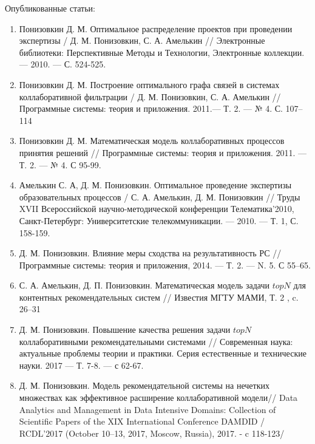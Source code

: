 \documentclass[a4paper,14pt]{report}
\theoremstyle{plain}
\theoremstyle{break}
\begin{document}
Опубликованные статьи:
\begin{enumerate}
\item Понизовкин Д. М.
Оптимальное распределение проектов при проведении экспертизы / Д. М. Понизовкин, С. А. Амелькин //
Электронные библиотеки: Перспективные Методы и Технологии,
Электронные коллекции. --- 2010. --- С. 524-525.
\item Понизовкин Д. М. Построение оптимального графа связей в системах коллаборативной фильтрации / Д. М. Понизовкин, С. А. Амелькин //
Программные системы: теория и приложения. 2011.--- Т. 2. --- № 4. С. 107–114
\item Понизовкин Д. М. Математическая модель коллаборативных процессов принятия решений //
Программные системы: теория и приложения. 2011. --- Т. 2. --- № 4. С 95-99.
\item Амелькин С. А, Д. М. Понизовкин. Оптимальное проведение экспертизы образовательных процессов / С. А. Амелькин, Д. М. Понизовкин //
Труды XVII Всероссийской научно-методической конференции Телематика’2010,
Санкт-Петербург: Университетские телекоммуникации. --- 2010. ---
Т. 1, С. 158-159.
\item Д. М. Понизовкин. Влияние меры сходства на результативность РС // Программные системы: теория и приложения, 2014. --- Т. 2. --- N. 5. С 55–65.
\item С. А. Амелькин, Д. П. Понизовкин. Математическая модель задачи $topN$ для
	контентных рекомендательных систем //
Известия МГТУ МАМИ, Т. 2 , c. 26–31

\item Д. М. Понизовкин.
	Повышение качества решения задачи $topN$ коллаборативными рекомендательными
	системами
	//
	Современная наука: актуальные проблемы теории и практики.
	Серия естественные и технические науки. 2017 ---
	Т. 7-8. --- с 62-67.
\item Д. М. Понизовкин.
		Модель рекомендательной системы на нечетких множествах
		как эффективное расширение коллаборативной модели//
		Data Analytics and Management in Data Intensive Domains:
		Collection of Scientific Papers of the XIX International
		Conference DAMDID / RCDL’2017 (October 10–13, 2017, Moscow, Russia),
		2017. - c 118-123/
\end{enumerate}
\end{document}
